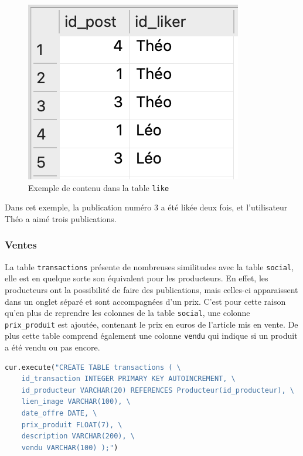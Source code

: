 \documentclass[11pt]{article}
\begin{document}
 
\begin{figure}[h]
    \centering
    \includegraphics[scale=0.65]{LikeBDExemple.png}
    \caption{Exemple de contenu dans la table \texttt{like}}
\end{figure}

Dans cet exemple, la publication numéro 3 a été likée deux fois, et l'utilisateur Théo a aimé trois publications.

\subsubsection{Ventes}

La table \texttt{transactions} présente de nombreuses similitudes avec la table \texttt{social}, elle est en quelque sorte son équivalent pour les producteurs. En effet, les producteurs ont la possibilité de faire des publications, mais celles-ci apparaissent dans un onglet séparé et sont accompagnées d'un prix. C'est pour cette raison qu'en plus de reprendre les colonnes de la table \texttt{social}, une colonne \texttt{prix\_produit} est ajoutée, contenant le prix en euros de l'article mis en vente. De plus cette table comprend également une colonne \texttt{vendu} qui indique si un produit a été vendu ou pas encore.

\begin{lstlisting}[language=Python, caption={Code Python permettant de créer la table \texttt{transaction}}]
cur.execute("CREATE TABLE transactions ( \
    id_transaction INTEGER PRIMARY KEY AUTOINCREMENT, \
    id_producteur VARCHAR(20) REFERENCES Producteur(id_producteur), \
    lien_image VARCHAR(100), \
    date_offre DATE, \
    prix_produit FLOAT(7), \
    description VARCHAR(200), \
    vendu VARCHAR(100) );")
\end{lstlisting}
    
\end{document}
